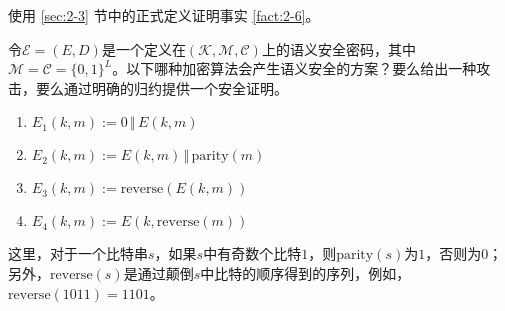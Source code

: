 \begin{exercise}\label{exer:2-9}
使用 \ref{sec:2-3} 节中的正式定义证明事实 \ref{fact:2-6}。
\end{exercise}

\begin{exercise}[练习语义安全性的定义]\label{exer:2-10}
令$\mathcal{E}=(E,D)$是一个定义在$(\mathcal{K},\mathcal{M},\mathcal{C})$上的语义安全密码，其中$\mathcal{M}=\mathcal{C}=\{0,1\}^L$。以下哪种加密算法会产生语义安全的方案？要么给出一种攻击，要么通过明确的归约提供一个安全证明。
\begin{enumerate}[\indent(a)]
	\item $E_1(k,m):=0\,\Vert\,E(k,m)$
	\item $E_2(k,m):=E(k,m)\,\Vert\,\mathrm{parity}(m)$
	\item $E_3(k,m):=\mathrm{reverse}(E(k,m))$
	\item $E_4(k,m):=E(k,\mathrm{reverse}(m))$
\end{enumerate}
这里，对于一个比特串$s$，如果$s$中有奇数个比特$1$，则$\mathrm{parity}(s)$为$1$，否则为$0$；另外，$\mathrm{reverse}(s)$是通过颠倒$s$中比特的顺序得到的序列，例如，$\mathrm{reverse}(1011)=1101$。
\end{exercise}

